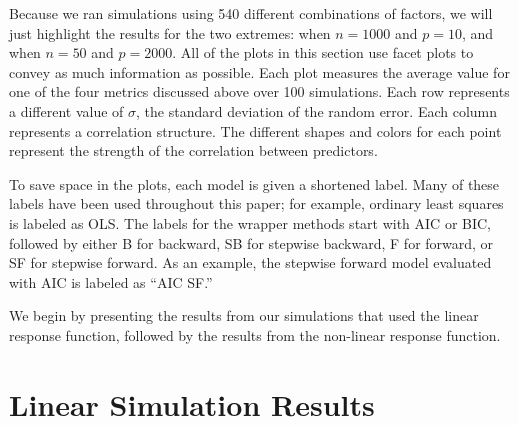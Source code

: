 \documentclass{article}
\begin{document}
	Because we ran simulations using 540 different combinations of factors, we will just highlight the results for the two extremes: when $n = 1000$ and $p = 10$, and when $n = 50$ and $p = 2000$. All of the plots in this section use facet plots to convey as much information as possible. Each plot measures the average value for one of the four metrics discussed above over 100 simulations. Each row represents a different value of $\sigma$, the standard deviation of the random error. Each column represents a correlation structure. The different shapes and colors for each point represent the strength of the correlation between predictors.
	
	To save space in the plots, each model is given a shortened label. Many of these labels have been used throughout this paper; for example, ordinary least squares is labeled as OLS. The labels for the wrapper methods start with AIC or BIC, followed by either B for backward, SB for stepwise backward, F for forward, or SF for stepwise forward. As an example, the stepwise forward model evaluated with AIC is labeled as ``AIC SF.''
	
	We begin by presenting the results from our simulations that used the linear response function, followed by the results from the non-linear response function.
	
	\section{Linear Simulation Results}
	
\end{document}
